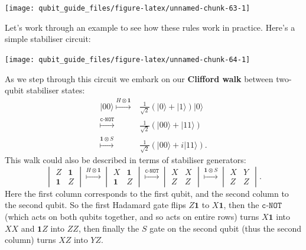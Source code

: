 \documentclass[fleqn,a4paper]{article}
\theoremstyle{definition}
\theoremstyle{definition}
\theoremstyle{definition}
\theoremstyle{definition}
\theoremstyle{remark}
\begin{document}
\begin{center}\texttt{[image: qubit\_guide\_files/figure-latex/unnamed-chunk-63-1]} \end{center}

Let's work through an example to see how these rules work in practice.
Here's a simple stabiliser circuit:

\begin{center}\texttt{[image: qubit\_guide\_files/figure-latex/unnamed-chunk-64-1]} \end{center}

As we step through this circuit we embark on our \textbf{Clifford walk} between two-qubit stabiliser states:
\[
  \begin{aligned}
    |00\rangle
    \overset{H\otimes\mathbf{1}}{\longmapsto}
    &\frac{1}{\sqrt{2}}(|0\rangle+|1\rangle)|0\rangle
  \\\overset{\texttt{c-NOT}}{\longmapsto}
    &\frac{1}{\sqrt{2}}(|00\rangle+|11\rangle)
  \\\overset{\mathbf{1}\otimes S}{\longmapsto}
    &\frac{1}{\sqrt{2}}(|00\rangle+i|11\rangle).
  \end{aligned}
\]
This walk could also be described in terms of stabiliser generators:
\[
  \begin{vmatrix}
    Z&\mathbf{1}
  \\\mathbf{1}&Z
  \end{vmatrix}
  \overset{H\otimes\mathbf{1}}{\longmapsto}
  \begin{vmatrix}
    X&\mathbf{1}
  \\\mathbf{1}&Z
  \end{vmatrix}
  \overset{\texttt{c-NOT}}{\longmapsto}
  \begin{vmatrix}
    X&X
  \\Z&Z
  \end{vmatrix}
  \overset{\mathbf{1}\otimes S}{\longmapsto}
  \begin{vmatrix}
    X&Y
  \\Z&Z
  \end{vmatrix}.
\]
Here the first column corresponds to the first qubit, and the second column to the second qubit.
So the first Hadamard gate flips \(Z\mathbf{1}\) to \(X\mathbf{1}\), then the \(\texttt{c-NOT}\) (which acts on both qubits together, and so acts on entire rows) turns \(X\mathbf{1}\) into \(XX\) and \(\mathbf{1}Z\) into \(ZZ\), then finally the \(S\) gate on the second qubit (thus the second column) turns \(XZ\) into \(YZ\).
\end{document}
